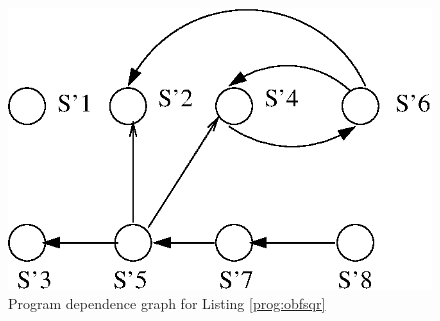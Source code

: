 \documentclass[twocolumn]{article}
\begin{document}
\begin{figure}[h]
 \centering
 \includegraphics[scale=0.3]{./obfdep1.eps}
 \caption{Program dependence graph for Listing \ref{prog:obfsqr}}
 \label{fig:obfsqr1}
\end{figure}
\end{document}

